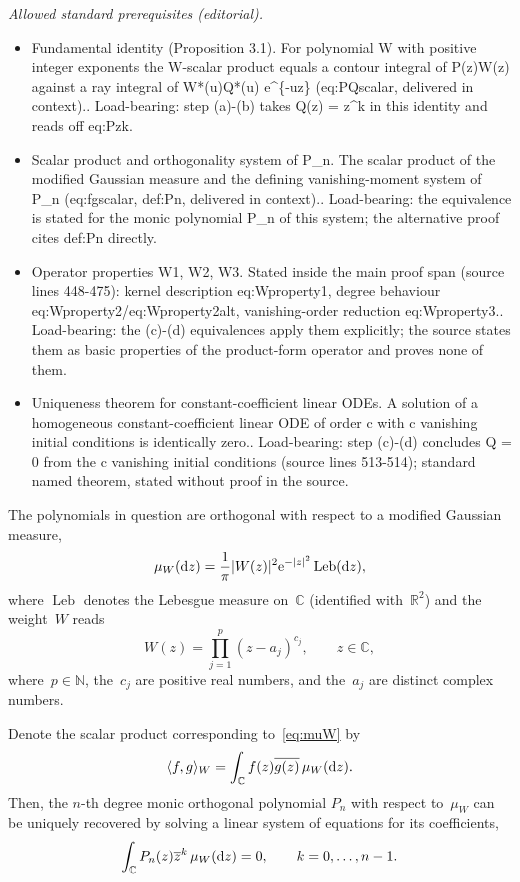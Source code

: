 \documentclass[10pt,a4paper]{article}
\providecommand{\samepage}{}
\numberwithin{equation}{section}
\DeclareMathOperator{\Leb}{Leb}
\newcommand*{\Cset}{\mathbb{C}} %
\newcommand*{\Rset}{\mathbb{R}} %
\newcommand*{\Nset}{\mathbb{N}} %
\begin{document}
\noindent\textit{Allowed standard prerequisites (editorial).}\begin{itemize}
\item Fundamental identity (Proposition 3.1). For polynomial W with positive integer exponents the W-scalar product equals a contour integral of P(z)W(z) against a ray integral of W*(u)Q*(u) e\textasciicircum{}\{-uz\} (eq:PQscalar, delivered in context).. Load-bearing: step (a)-(b) takes Q(z) = z\textasciicircum{}k in this identity and reads off eq:Pzk.
\item Scalar product and orthogonality system of P\_n. The scalar product of the modified Gaussian measure and the defining vanishing-moment system of P\_n (eq:fgscalar, def:Pn, delivered in context).. Load-bearing: the equivalence is stated for the monic polynomial P\_n of this system; the alternative proof cites def:Pn directly.
\item Operator properties W1, W2, W3. Stated inside the main proof span (source lines 448-475): kernel description eq:Wproperty1, degree behaviour eq:Wproperty2/eq:Wproperty2alt, vanishing-order reduction eq:Wproperty3.. Load-bearing: the (c)-(d) equivalences apply them explicitly; the source states them as basic properties of the product-form operator and proves none of them.
\item Uniqueness theorem for constant-coefficient linear ODEs. A solution of a homogeneous constant-coefficient linear ODE of order c with c vanishing initial conditions is identically zero.. Load-bearing: step (c)-(d) concludes Q = 0 from the c vanishing initial conditions (source lines 513-514); standard named theorem, stated without proof in the source.
\end{itemize}\medskip
 The polynomials in question are orthogonal with respect to a modified Gaussian measure,
 \begin{gather}
 \label{eq:muW}
 \mu_W({\rm d}z) = \frac{1}{\pi} |W(z)|^2 {\rm e}^{-|z|^2} \Leb({\rm d}z),
 \end{gather}
 where $\Leb$ denotes the Lebesgue measure on~$\Cset$ (identified with~$\Rset^2$) and the weight~$W$ reads{\samepage
 \begin{equation}
 \label{eq:Wdef}
 W(z) = \prod_{j=1}^p (z-a_j)^{c_j}, \qquad z \in \Cset,
 \end{equation}
 where~$p \in \Nset$, the~$c_j$ are positive real numbers, and the~$a_j$ are distinct complex numbers.}

 Denote the scalar product corresponding to~\eqref{eq:muW} by
 \begin{equation}
 \label{eq:fgscalar}
 \langle f, g \rangle_W = \int_{\Cset} f(z)\overline{g(z)} \, \mu_W({\rm d}z).
 \end{equation}
 Then, the $n$-th degree monic orthogonal polynomial $P_n$ with
 respect to~$\mu_W$ can be uniquely recovered by solving a linear system of equations for its coefficients,
 \begin{equation}
 \label{def:Pn}
 \int_{\Cset} P_{n}(z)\overline{z}^k\, \mu_W({\rm d}z)=0, \qquad k=0,\dots,n-1.
 \end{equation}
\end{document}

